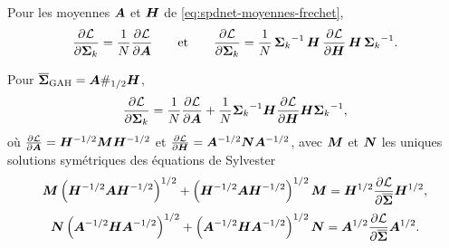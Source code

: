 \begin{proposition}
\label{prop:spdnet-grad-arith-harm}
  Pour les moyennes $\boldsymbol{A}$ et $\boldsymbol{H}$ de
  \cref{eq:spdnet-moyennes-frechet},
  \begin{equation}
    \frac{\partial \mathcal{L}}{\partial \boldsymbol{\Sigma}_k}
    =
    \frac{1}{N}\frac{\partial \mathcal{L}}{\partial \boldsymbol{A}}
    \qquad\text{et}\qquad
    \frac{\partial \mathcal{L}}{\partial \boldsymbol{\Sigma}_k}
    =
    \frac{1}{N}\,{\boldsymbol{\Sigma}_k}^{-1}\,\boldsymbol{H}\,\frac{\partial \mathcal{L}}{\partial \boldsymbol{H}}\,\boldsymbol{H}\,{\boldsymbol{\Sigma}_k}^{-1}.
    \label{eq:spdnet-grad-arith-harm}
  \end{equation}
\end{proposition}

\begin{proposition}
\label{prop:spdnet-grad-gah}
  Pour $\overline{\boldsymbol{\Sigma}}_{\mathrm{GAH}}=\boldsymbol{A}\#_{1/2}\boldsymbol{H}$,
  \begin{equation}
    \frac{\partial \mathcal{L}}{\partial \boldsymbol{\Sigma}_k}
    =
    \frac{1}{N}\frac{\partial \mathcal{L}}{\partial \boldsymbol{A}}
    +
    \frac{1}{N}{\boldsymbol{\Sigma}_k}^{-1}\boldsymbol{H}\frac{\partial \mathcal{L}}{\partial \boldsymbol{H}}\boldsymbol{H}{\boldsymbol{\Sigma}_k}^{-1},
    \label{eq:spdnet-grad-gah}
  \end{equation}
  où
  $\frac{\partial \mathcal{L}}{\partial \boldsymbol{A}}=\boldsymbol{H}^{-1/2}\boldsymbol{M}\boldsymbol{H}^{-1/2}$ et
  $\frac{\partial \mathcal{L}}{\partial \boldsymbol{H}}=\boldsymbol{A}^{-1/2}\boldsymbol{N}\boldsymbol{A}^{-1/2}$, avec $\boldsymbol{M}$
  et $\boldsymbol{N}$ les uniques solutions symétriques des équations de Sylvester
  \begin{equation}
    \boldsymbol{M}\left(\boldsymbol{H}^{-1/2}\boldsymbol{A}\boldsymbol{H}^{-1/2}\right)^{1/2}
    +
    \left(\boldsymbol{H}^{-1/2}\boldsymbol{A}\boldsymbol{H}^{-1/2}\right)^{1/2}\boldsymbol{M}
    =
    \boldsymbol{H}^{1/2}\frac{\partial \mathcal{L}}{\partial \overline{\boldsymbol{\Sigma}}}\boldsymbol{H}^{1/2},
    \label{eq:spdnet-grad-gah-M}
  \end{equation}
  \begin{equation}
    \boldsymbol{N}\left(\boldsymbol{A}^{-1/2}\boldsymbol{H}\boldsymbol{A}^{-1/2}\right)^{1/2}
    +
    \left(\boldsymbol{A}^{-1/2}\boldsymbol{H}\boldsymbol{A}^{-1/2}\right)^{1/2}\boldsymbol{N}
    =
    \boldsymbol{A}^{1/2}\frac{\partial \mathcal{L}}{\partial \overline{\boldsymbol{\Sigma}}}\boldsymbol{A}^{1/2}.
    \label{eq:spdnet-grad-gah-N}
  \end{equation}
\end{proposition}


